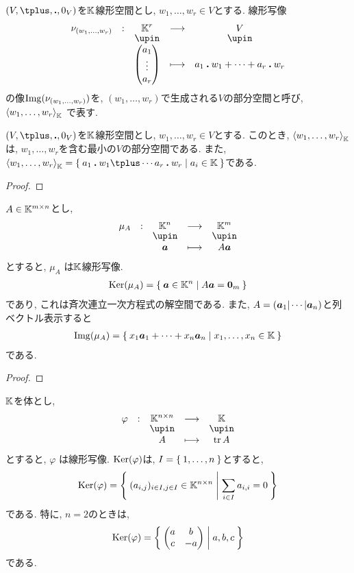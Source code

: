 \begin{definition}
  $(V,\plus,\act,0_V)$を$\mathbb{K}$線形空間とし,
  $w_1,\ldots,w_r\in V$とする.
  線形写像
    \begin{align*}
      \shazo{\nu_{(w_1,\ldots,w_r)}}{\KK^r}{V}
      {\begin{pmatrix}a_1\\\vdots\\a_r\end{pmatrix}}{a_1\act w_1+\cdots+a_r\act w_r}
    \end{align*}
  の像$\operatorname{Img}(\nu_{(w_1,\ldots,w_r)})$を,
  $(w_1,\ldots,w_r)$で生成される$V$の部分空間と呼び,
  $\Braket{w_1,\ldots,w_r}_{\mathbb{K}}$
  で表す.  
\end{definition}
\begin{remark}
  $(V,\plus,\act,0_V)$を$\mathbb{K}$線形空間とし,
  $w_1,\ldots,w_r\in V$とする.
  このとき,
  $\Braket{w_1,\ldots,w_r}_{\mathbb{K}}$
  は,
  $w_1,\ldots,w_r$を含む最小の$V$の部分空間である.
  また, 
  $\Braket{w_1,\ldots,w_r}_{\KK}=\Set{a_1\act w_1\plus\cdots a_r\act w_r|a_i\in\KK}$である.
\end{remark}
\begin{proof}\end{proof}

\begin{example}
  $A\in \mathbb{K}^{m\times n}$とし,
  \begin{align*}
    \shazo{\mu_A}{\KK^{n}}{\KK^{m}}
    {\aaa}{A\aaa}
  \end{align*}
  とすると, $\mu_A$
  は$\mathbb{K}$線形写像.
  \begin{align*}
    \operatorname{Ker}(\mu_A)=\Set{\boldsymbol{a}\in\mathbb{K}^n|A\boldsymbol{a}=\boldsymbol{0}_m}
  \end{align*}
  であり, これは斉次連立一次方程式の解空間である.
  また, $A=(\boldsymbol{a}_1|\cdots|\boldsymbol{a}_n)$と列ベクトル表示すると
  \begin{align*}
    \operatorname{Img}(\mu_A)=\Set{x_1\boldsymbol{a}_1+\cdots+x_n\boldsymbol{a}_n|x_1,\ldots,x_n\in \mathbb{K}}
  \end{align*}
  である.
\end{example}
\begin{proof}\end{proof}

\begin{example}
$\mathbb{K}$を体とし,  
  \begin{align*}
    \shazo{\varphi}{\KK^{n\times n}}{\KK}
    {A}{\tr A}
  \end{align*}
  とすると, $\varphi$
  は線形写像.
  $\operatorname{Ker}(\varphi)$は, $I=\Set{1,\dots,n}$とすると,
  \begin{align*}
    \operatorname{Ker}(\varphi)=
    \Set{(a_{i,j})_{i\in I,j\in I} \in\mathbb{K}^{n\times n}|\sum_{i\in I}a_{i,i}=0}
  \end{align*}
  である. 特に, $n=2$のときは,
  \begin{align*}
    \operatorname{Ker}(\varphi)=
    \Set{\begin{pmatrix}a&b\\c&-a\end{pmatrix}|a,b,c}
  \end{align*}
  である.
\end{example}

